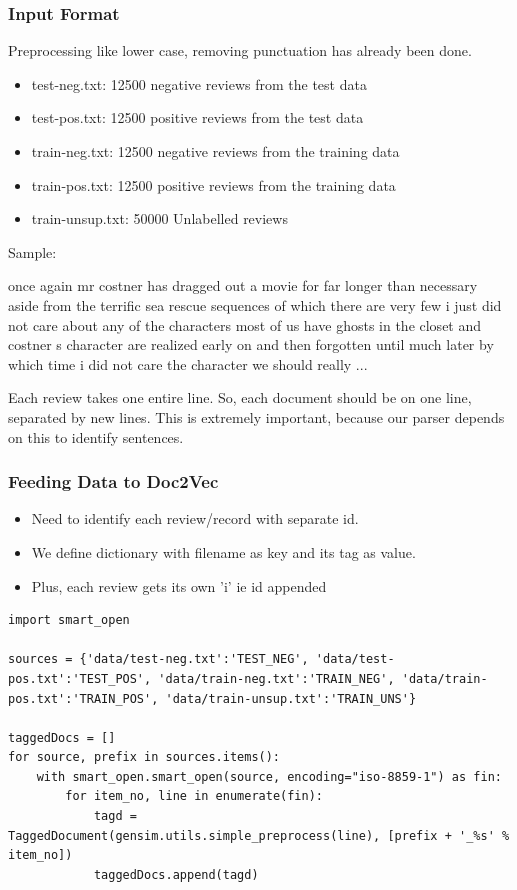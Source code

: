 \begin{frame}[fragile]\frametitle{Input Format}
Preprocessing like lower case, removing punctuation has already been done.

\begin{itemize}
\item test-neg.txt: 12500 negative  reviews from the test data
\item test-pos.txt: 12500 positive  reviews from the test data
\item train-neg.txt: 12500 negative  reviews from the training data
\item train-pos.txt: 12500 positive  reviews from the training data
\item train-unsup.txt: 50000 Unlabelled  reviews
\end{itemize}

Sample:
\begin{block}
once again mr costner has dragged out a movie for far longer than necessary aside from the terrific sea rescue sequences of which there are very few i just did not care about any of the characters most of us have ghosts in the closet and costner s character are realized early on and then forgotten until much later by which time i did not care the character we should really ...
\end{block}

Each review takes one entire line. So, each document should be on one line, separated by new lines. This is extremely important, because our parser depends on this to identify sentences.
\end{frame}

\begin{frame}[fragile]\frametitle{Feeding Data to Doc2Vec}
\begin{itemize}
\item Need to identify each review/record with separate id.
\item We define dictionary with filename as key and its tag as value.
\item Plus, each review gets its own 'i' ie id appended
\end{itemize}
\begin{lstlisting}
import smart_open

sources = {'data/test-neg.txt':'TEST_NEG', 'data/test-pos.txt':'TEST_POS', 'data/train-neg.txt':'TRAIN_NEG', 'data/train-pos.txt':'TRAIN_POS', 'data/train-unsup.txt':'TRAIN_UNS'}

taggedDocs = []
for source, prefix in sources.items():
    with smart_open.smart_open(source, encoding="iso-8859-1") as fin:
        for item_no, line in enumerate(fin):
            tagd = TaggedDocument(gensim.utils.simple_preprocess(line), [prefix + '_%s' % item_no])
            taggedDocs.append(tagd)
\end{lstlisting}

\end{frame}

